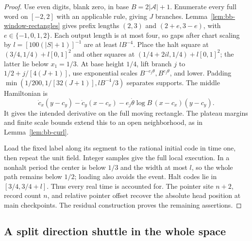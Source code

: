 \begin{proof}
Use even digits, blank zero, in base $B=2|\mathcal A|+1$.
Enumerate every full word on $[-2,2]$ with an applicable rule, giving
$J$ branches.
Lemma~\ref{lem:bb-window-rectangles} gives prefix lengths $(2,3)$
and $(2+e,3-e)$, with $e\in\{-1,0,1,2\}$.
Each output length is at most four, so gaps after chart scaling
by $l=[100(|S|+1)]^{-1}$ are at least $lB^{-4}$.
Place the halt square at $(3/4,1/4)+l[0,1]^2$ and other squares
at $(1/4+2il,1/4)+l[0,1]^2$; the latter lie below $x_1=1/3$.
At base height $1/4$, lift branch $j$ to
$1/2+j/[4(J+1)]$, use exponential scales $B^{-e_j\theta},B^{e_j\theta}$,
and lower.  Padding
$\min(1/200,1/[32(J+1)],lB^{-4}/3)$ separates supports.
The middle Hamiltonian is
\[
 \dot c_x(y-c_y)-\dot c_y(x-c_x)
      -e_j\dot\theta\log B\,(x-c_x)(y-c_y).
\]
It gives the intended derivative on the full moving rectangle.
The plateau margins and finite scale bounds extend this to an open
neighborhood, as in Lemma~\ref{lem:bb-curl}.

Load the fixed label along its segment to the rational initial code
in time one, then repeat the unit field.  Integer samples give the
full local execution.  In a nonhalt period the center is below $1/3$
and the width at most $l$, so the whole path remains below $1/2$;
loading also avoids the event.  Halt codes lie in $[3/4,3/4+l]$.
Thus every real time is accounted for.  The pointer site $n+2$,
record count $n$, and relative pointer offset recover the absolute
head position at main checkpoints.  The residual construction
proves the remaining assertions.
\end{proof}

\subsection{A split direction shuttle in the whole space}
\label{sec:bb-direction-shuttle}

